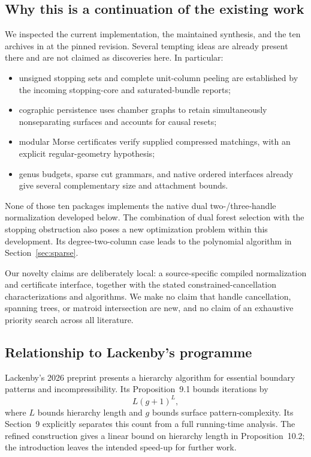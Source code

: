 \subsection{Why this is a continuation of the existing work}
We inspected the current implementation, the maintained synthesis, and the
ten archives in  at the pinned revision.  Several tempting
ideas are already present there and are not claimed as discoveries here.
In particular:
\begin{itemize}
\item unsigned stopping sets and complete unit-column peeling are established
  by the incoming stopping-core and saturated-bundle reports;
\item cographic persistence uses chamber graphs to retain simultaneously
  nonseparating surfaces and accounts for causal resets;
\item modular Morse certificates verify supplied compressed matchings, with
  an explicit regular-geometry hypothesis;
\item genus budgets, sparse cut grammars, and native ordered interfaces already
  give several complementary size and attachment bounds.
\end{itemize}
None of those ten packages implements the native dual two-/three-handle
normalization developed below.  The combination of dual forest selection
with the stopping obstruction also poses a new optimization problem within
this development.  Its degree-two-column case leads to the polynomial
algorithm in Section~\ref{sec:sparse}.

Our novelty claims are deliberately local: a source-specific compiled
normalization and certificate interface, together with the stated
constrained-cancellation characterizations and algorithms.  We make no claim
that handle cancellation, spanning trees, or matroid intersection are new,
and no claim of an exhaustive priority search across all literature.

\subsection{Relationship to Lackenby's programme}
Lackenby's 2026 preprint \cite{Lackenby2026} presents a hierarchy algorithm
for essential boundary patterns and incompressibility.  Its
Proposition~9.1 bounds iterations by
\begin{equation}\label{eq:lackenby-iterations}
                 L(g+1)^L,
\end{equation}
where $L$ bounds hierarchy length and $g$ bounds surface pattern-complexity.
Its Section~9 explicitly separates this count from a full running-time
analysis.  The refined construction gives a linear bound on hierarchy
length in Proposition~10.2; the introduction leaves the intended speed-up
for further work.

